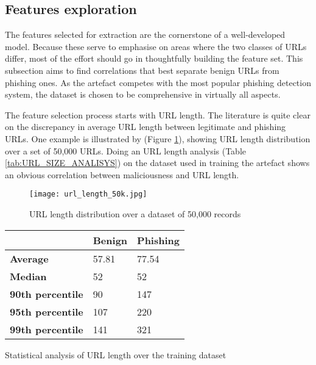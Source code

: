 \subsection{Features exploration}
The features selected for extraction are the cornerstone of a well-developed model. Because these serve to emphasise on areas where the two classes of URLs differ, most of the effort should go in thoughtfully building the feature set. This subsection aims to find correlations that best separate benign URLs from phishing ones. As the artefact competes with the most popular phishing detection system, the dataset is chosen to be comprehensive in virtually all aspects.

The feature selection process starts with URL length. The literature is quite clear on the discrepancy in average URL length between legitimate and phishing URLs. One example is illustrated by \cite{Li_Yukun} (Figure \ref{fig:URL_LENGTH_DISTRIBUTION}), showing URL length distribution over a set of 50,000 URLs. Doing an URL length analysis (Table \ref{tab:URL_SIZE_ANALISYS}) on the dataset used in training the artefact shows an obvious correlation between maliciousness and URL length.

\begin{figure}[t]
	\centering
	\texttt{[image: url\_length\_50k.jpg]}
	\caption{URL length distribution over a dataset of 50,000 records}
	\label{fig:URL_LENGTH_DISTRIBUTION}
\end{figure}

\begin{singlespace}
	\small
	\begin{center}
		\label{tab:URL_SIZE_ANALISYS}
		\begin{tabularx}{\textwidth}{ | X | X | X | }
			\hline
			                         & \textbf{Benign} & \textbf{Phishing} \\
			\hline
			\textbf{Average}         & 57.81           & 77.54             \\
			\hline
			\textbf{Median}          & 52              & 52                \\
			\hline
			\textbf{90th percentile} & 90              & 147               \\
			\hline
			\textbf{95th percentile} & 107             & 220               \\
			\hline
			\textbf{99th percentile} & 141             & 321               \\
			\hline
		\end{tabularx}
		\captionsetup{type=table}\caption{Statistical analysis of URL length over the training dataset}
	\end{center}
\end{singlespace}

